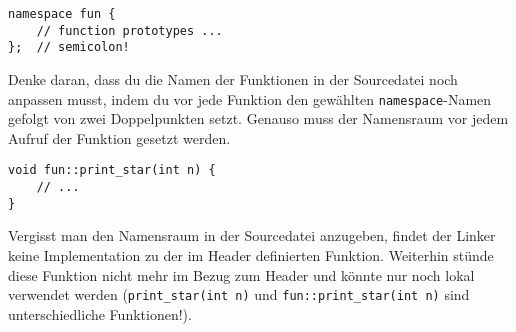 \begin{lstlisting}
namespace fun {
	// function prototypes ...
};	// semicolon!
\end{lstlisting}

Denke daran, dass du die Namen der Funktionen in der Sourcedatei noch anpassen musst, indem du vor jede Funktion den gewählten \texttt{namespace}-Namen gefolgt von zwei Doppelpunkten setzt. Genauso muss der Namensraum vor jedem Aufruf der Funktion gesetzt werden.

\begin{lstlisting}
void fun::print_star(int n) {
	// ...
}
\end{lstlisting}

Vergisst man den Namensraum in der Sourcedatei anzugeben, findet der Linker keine Implementation zu der im Header definierten Funktion.
Weiterhin stünde diese Funktion nicht mehr im Bezug zum Header und könnte nur noch lokal verwendet werden (\texttt{print\_star(int n)} und \texttt{fun::print\_star(int n)} sind unterschiedliche Funktionen!).

